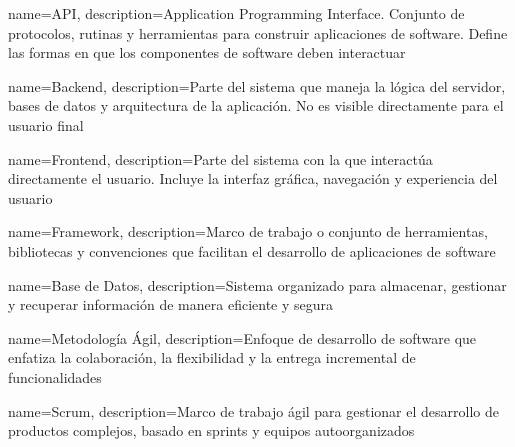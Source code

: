 
\makeglossaries


{
    name={API},
    description={Application Programming Interface. Conjunto de protocolos, rutinas y herramientas para construir aplicaciones de software. Define las formas en que los componentes de software deben interactuar}
}

{
    name={Backend},
    description={Parte del sistema que maneja la lógica del servidor, bases de datos y arquitectura de la aplicación. No es visible directamente para el usuario final}
}

{
    name={Frontend},
    description={Parte del sistema con la que interactúa directamente el usuario. Incluye la interfaz gráfica, navegación y experiencia del usuario}
}

{
    name={Framework},
    description={Marco de trabajo o conjunto de herramientas, bibliotecas y convenciones que facilitan el desarrollo de aplicaciones de software}
}

{
    name={Base de Datos},
    description={Sistema organizado para almacenar, gestionar y recuperar información de manera eficiente y segura}
}


{
    name={Metodología Ágil},
    description={Enfoque de desarrollo de software que enfatiza la colaboración, la flexibilidad y la entrega incremental de funcionalidades}
}

{
    name={Scrum},
    description={Marco de trabajo ágil para gestionar el desarrollo de productos complejos, basado en sprints y equipos autoorganizados}
}


